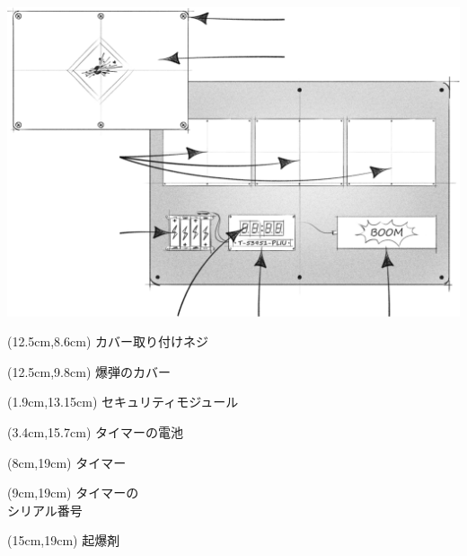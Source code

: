 \vspace{1em}
\includegraphics[width=\textwidth]{./images/2.png}

\begin{textblock*}{5cm}(12.5cm,8.6cm)
    \tegakifont カバー取り付けネジ
\end{textblock*}
\begin{textblock*}{5cm}(12.5cm,9.8cm)
    \tegakifont 爆弾のカバー
\end{textblock*}
\begin{textblock*}{5cm}(1.9cm,13.15cm)
    \tegakifont セキュリティモジュール
\end{textblock*}
\begin{textblock*}{5cm}(3.4cm,15.7cm)
    \tegakifont タイマーの電池
\end{textblock*}
\begin{textblock*}{5cm}(8cm,19cm)
    \tegakifont タイマー
\end{textblock*}
\begin{textblock*}{5cm}(9cm,19cm)
    \centering
    \tegakifont タイマーの\\シリアル番号
\end{textblock*}
\begin{textblock*}{5cm}(15cm,19cm)
    \tegakifont 起爆剤
\end{textblock*}


\newpage


\newpage


\newpage


\newpage


\newpage


